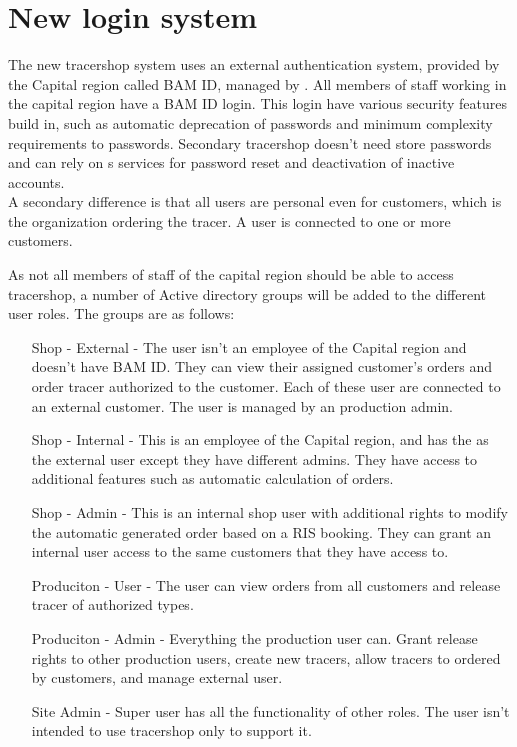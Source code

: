 \documentclass{article}
\begin{document}
\section*{New login system}

The new tracershop system uses an external authentication system, provided by the Capital region called BAM ID, managed by . All members of staff working in the capital region
have a BAM ID login. This login have various security features build in, such as automatic deprecation of passwords and minimum complexity requirements to passwords.
Secondary tracershop doesn't need store passwords and can rely on s services for password reset and deactivation of inactive accounts.\\
A secondary difference is that all users are personal even for customers, which is the organization ordering the tracer. A user is connected to one or more customers.

As not all members of staff of the capital region should be able to access tracershop, a number of Active directory groups will be added to the different user roles.
The groups are as follows:

\begin{itemize}
  \item[Shop - External] - The user isn't an employee of the Capital region and doesn't have BAM ID. They can view their assigned customer's orders and order tracer authorized to the customer.
  Each of these user are connected to an external customer. The user is managed by an production admin.
  \item[Shop - Internal] - This is an employee of the Capital region, and has the as the external user except they have different admins.
  They have access to additional features such as automatic calculation of orders.
  \item[Shop - Admin] - This is an internal shop user with additional rights to modify the automatic generated order based on a RIS booking.
  They can grant an internal user access to the same customers that they have access to.
  \item[Produciton - User] - The user can view orders from all customers and release tracer of authorized types.
  \item[Produciton - Admin] - Everything the production user can. Grant release rights to other production users, create new tracers, allow tracers to ordered by customers, and
  manage external user.
  \item[Site Admin] - Super user has all the functionality of other roles. The user isn't intended to use tracershop only to support it.
\end{itemize}
\end{document}
